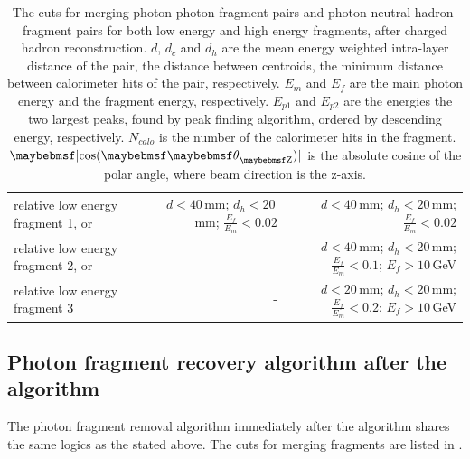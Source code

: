 \begin{table}[htbp]
\begin{tabular}{l  r  r }
\multicolumn{1}{L{0.3\textwidth}}{relative low energy fragment 1, or} & \multicolumn{1}{R{0.3\textwidth}}{$d < 40$\,mm; $d_h < 20$\,mm; $\frac{E_f}{E_m} < 0.02$} & \multicolumn{1}{R{0.3\textwidth}}{$d < 40$\,mm; $d_h < 20$\,mm; $\frac{E_f}{E_m} < 0.02$} \\
\multicolumn{1}{L{0.3\textwidth}}{relative low energy fragment 2, or} & \multicolumn{1}{R{0.3\textwidth}}{-}  & \multicolumn{1}{R{0.3\textwidth}}{$d < 40$\,mm; $d_h < 20$\,mm; $\frac{E_f}{E_m} < 0.1$; $E_f > 10$\,GeV} \\
\multicolumn{1}{L{0.3\textwidth}}{relative low energy fragment 3} & \multicolumn{1}{R{0.3\textwidth}}{-}  & \multicolumn{1}{R{0.3\textwidth}}{$d < 20$\,mm; $d_h < 20$\,mm; $\frac{E_f}{E_m} < 0.2$; $E_f > 10$\,GeV} \\
\hline
\hline
\end{tabular}

\caption[The cuts for photon fragment removal algorithm in the \ECAL.]%
{The cuts for merging photon-photon-fragment pairs and photon-neutral-hadron-fragment pairs for both low energy and high energy fragments, after charged hadron reconstruction. $d$, $d_c$ and $d_h$ are the mean energy weighted intra-layer distance of the pair, the distance between centroids, the minimum distance between calorimeter hits of the pair, respectively. $E_m$ and $E_f$ are the main photon energy and the fragment energy, respectively. $E_{p1}$ and $E_{p2}$ are the energies the two largest peaks, found by peak finding algorithm, ordered by descending energy, respectively. $N_{calo}$ is the number of the calorimeter hits in the fragment. $\absCosTheta$ is the absolute cosine of the polar angle, where beam direction is the z-axis. }
\label{tab:photonFragRemovalCuts}
\end{table}

\subsection{Photon fragment recovery algorithm after the \PhotonReconstruction algorithm}

The photon fragment removal algorithm immediately after the \PhotonReconstruction algorithm shares the same logics as the stated above. The cuts for merging fragments are listed in .



